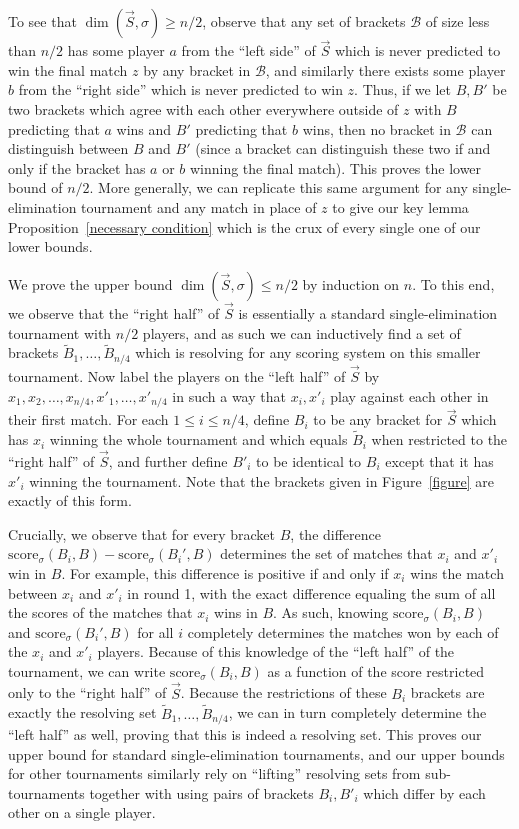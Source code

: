 \documentclass[12pt,letterpaper]{article}
\theoremstyle{definition}
\newcommand{\sig}{\sigma}
\renewcommand{\1}{\mathbbm{1}}
\renewcommand{\c}[1]{\mathcal{#1}}
\newcommand{\score}{\mathrm{score}}
\newcommand{\tour}{\vec{S}}
\begin{document}
To see that $\dim(\tour,\sig)\ge n/2$, observe that any set of brackets $\c{B}$ of size less than $n/2$ has some player $a$ from the ``left side'' of $\tour$ which is never predicted to win the final match $z$ by any bracket in $\c{B}$, and similarly there exists some player $b$ from the ``right side'' which is never predicted to win $z$.  Thus, if we let $B,B'$ be two brackets which agree with each other everywhere outside of $z$ with $B$ predicting that $a$ wins and $B'$ predicting that $b$ wins, then no bracket in $\c{B}$ can distinguish between $B$ and $B'$ (since a bracket can distinguish these two if and only if the bracket has $a$ or $b$ winning the final match).  This proves the lower bound of $n/2$.  More generally, we can replicate this same argument for any single-elimination tournament and any match in place of $z$ to give our key lemma Proposition~\ref{necessary condition} which is the crux of every single one of our lower bounds.

We prove the upper bound $\dim(\tour,\sig)\le n/2$ by induction on $n$.  To this end, we observe that the ``right half'' of $\tour$ is essentially a standard single-elimination tournament with $n/2$ players, and as such we can inductively find a set of brackets $\widetilde{B}_1,\ldots,\widetilde{B}_{n/4}$ which is resolving for any scoring system on this smaller tournament.  Now label the players on the ``left half'' of $\tour$ by $x_1,x_2,\ldots,x_{n/4},x'_1,\ldots,x'_{n/4}$ in such a way that $x_i,x'_i$ play against each other in their first match.  For each $1\le i\le n/4$, define $B_i$ to be any bracket for $\tour$ which has $x_i$ winning the whole tournament and which equals $\widetilde{B}_i$ when restricted to the ``right half'' of $\tour$, and further define $B'_i$ to be identical to $B_i$ except that it has $x'_i$ winning the tournament.  Note that the brackets given in Figure~\ref{figure} are exactly of this form.

Crucially, we observe that for every bracket $B$, the difference $\score_\sig(B_i,B)-\score_\sig(B_i',B)$ determines the set of matches that $x_i$ and $x'_i$ win in $B$.  For example, this difference is positive if and only if $x_i$ wins the match between $x_i$ and $x'_i$ in round 1, with the exact difference equaling the sum of all the scores of the matches that $x_i$ wins in $B$.  As such, knowing $\score_\sig(B_i,B)$ and $\score_\sig(B_i',B)$ for all $i$ completely determines the matches won by each of the $x_i$ and $x'_i$ players.  Because of this knowledge of the ``left half'' of the tournament, we can write $\score_\sig(B_i,B)$ as a function of the score restricted only to the ``right half'' of $\tour$.  Because the restrictions of these $B_i$ brackets are exactly the resolving set $\widetilde{B}_1,\ldots,\widetilde{B}_{n/4}$, we can in turn completely determine the ``left half'' as well, proving that this is indeed a resolving set.  This proves our upper bound for standard single-elimination tournaments, and our upper bounds for other tournaments similarly rely on ``lifting'' resolving sets from sub-tournaments together with using pairs of brackets $B_i,B'_i$ which differ by each other on a single player.
\end{document}
